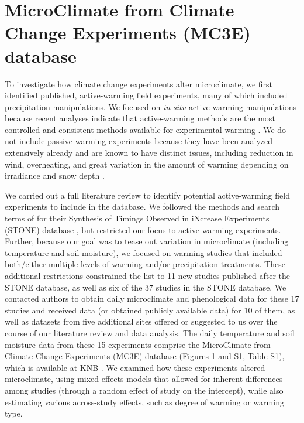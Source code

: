 \documentclass{article}
\begin{document}
\section* {MicroClimate from Climate Change Experiments (MC3E) database}
\par To investigate how climate change experiments alter microclimate, we first identified published, active-warming field experiments, many of which included precipitation manipulations. We focused on \textit{in situ} active-warming manipulations because recent analyses indicate that active-warming methods are the most controlled and consistent methods available for experimental warming \citep{kimball2005,kimball2008,aronson2009,wolkovich2012}. We do not include passive-warming experiments because they have been analyzed extensively already and are known to have distinct issues, including reduction in wind, overheating, and great variation in the amount of warming depending on irradiance and snow depth \citep[][see also Table S2]{marion1997,shaver2000,wolkovich2012,bokhorst2013}.
\par We carried out a full literature review to identify potential active-warming field experiments to include in the database. We followed the methods and search terms of \citet{wolkovich2012} for their Synthesis of Timings Observed in iNcrease Experiments (STONE) database \citep{wolkovich2012}, but restricted our focus to active-warming experiments. Further, because our goal was to tease out variation in microclimate (including temperature and soil moisture), we focused on warming studies that included both/either multiple levels of warming and/or precipitation treatments. These additional restrictions constrained the list to 11 new studies published after the STONE database, as well as six of the 37 studies in the STONE database. We contacted authors to obtain daily microclimate and phenological data for these 17 studies and received data (or obtained publicly available data) for 10 of them, as well as datasets from five additional sites offered or suggested to us over the course of our literature review and data analysis. The daily temperature and soil moisture data from these 15 experiments comprise the MicroClimate from Climate Change Experiments (MC3E) database (Figures 1 and S1, Table S1), which is available at KNB \citep{ettinger2018}. We examined how these experiments altered microclimate, using mixed-effects models that allowed for inherent differences among studies (through a random effect of study on the intercept), while also estimating various across-study effects, such as degree of warming or warming type. 
\end{document}
